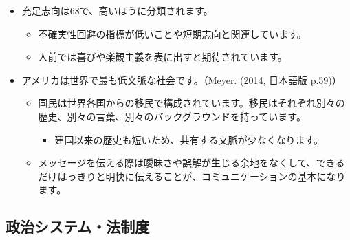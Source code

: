 \documentclass[
]{book}
\providecommand{\tightlist}{%
  \setlength{\itemsep}{0pt}\setlength{\parskip}{0pt}}
\begin{document}
\begin{itemize}
\item
  充足志向は68で、高いほうに分類されます。

  \begin{itemize}
  \item
    不確実性回避の指標が低いことや短期志向と関連しています。
  \item
    人前では喜びや楽観主義を表に出すと期待されています。
  \end{itemize}
\item
  アメリカは世界で最も低文脈な社会です。（Meyer. (2014, 日本語版 p.59)）

  \begin{itemize}
  \item
    国民は世界各国からの移民で構成されています。移民はそれぞれ別々の歴史、別々の言葉、別々のバックグラウンドを持っています。

    \begin{itemize}
    \tightlist
    \item
      建国以来の歴史も短いため、共有する文脈が少なくなります。
    \end{itemize}
  \item
    メッセージを伝える際は曖昧さや誤解が生じる余地をなくして、できるだけはっきりと明快に伝えることが、コミュニケーションの基本になります。
  \end{itemize}
\end{itemize}

\hypertarget{us-politics}{%
\subsection{政治システム・法制度}\label{us-politics}}
\end{document}
